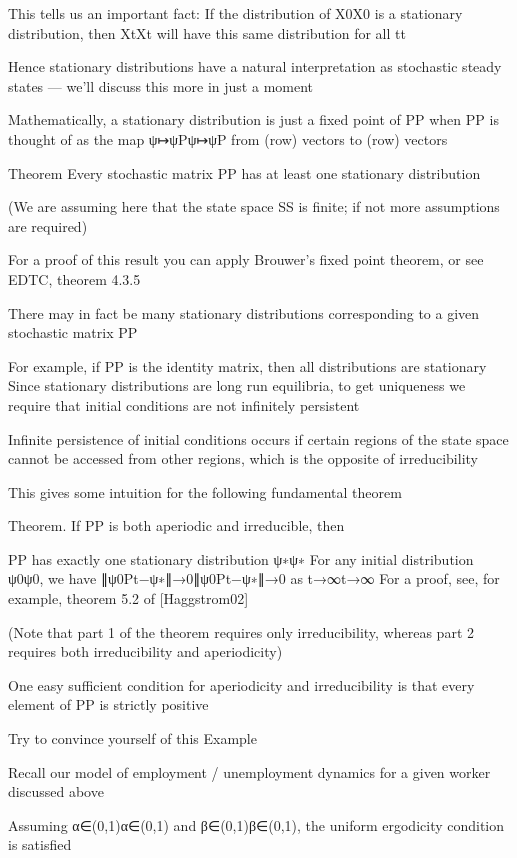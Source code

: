 This tells us an important fact: If the distribution of X0X0 is a stationary distribution, then XtXt will have this same distribution for all tt

Hence stationary distributions have a natural interpretation as stochastic steady states — we’ll discuss this more in just a moment

Mathematically, a stationary distribution is just a fixed point of PP when PP is thought of as the map ψ↦ψPψ↦ψP from (row) vectors to (row) vectors

Theorem Every stochastic matrix PP has at least one stationary distribution

(We are assuming here that the state space SS is finite; if not more assumptions are required)

For a proof of this result you can apply Brouwer’s fixed point theorem, or see EDTC, theorem 4.3.5

There may in fact be many stationary distributions corresponding to a given stochastic matrix PP

For example, if PP is the identity matrix, then all distributions are stationary
Since stationary distributions are long run equilibria, to get uniqueness we require that initial conditions are not infinitely persistent

Infinite persistence of initial conditions occurs if certain regions of the state space cannot be accessed from other regions, which is the opposite of irreducibility

This gives some intuition for the following fundamental theorem

Theorem. If PP is both aperiodic and irreducible, then

PP has exactly one stationary distribution ψ∗ψ∗
For any initial distribution ψ0ψ0, we have ∥ψ0Pt−ψ∗∥→0∥ψ0Pt−ψ∗∥→0 as t→∞t→∞
For a proof, see, for example, theorem 5.2 of [Haggstrom02]

(Note that part 1 of the theorem requires only irreducibility, whereas part 2 requires both irreducibility and aperiodicity)

One easy sufficient condition for aperiodicity and irreducibility is that every element of PP is strictly positive

Try to convince yourself of this
Example

Recall our model of employment / unemployment dynamics for a given worker discussed above

Assuming α∈(0,1)α∈(0,1) and β∈(0,1)β∈(0,1), the uniform ergodicity condition is satisfied

